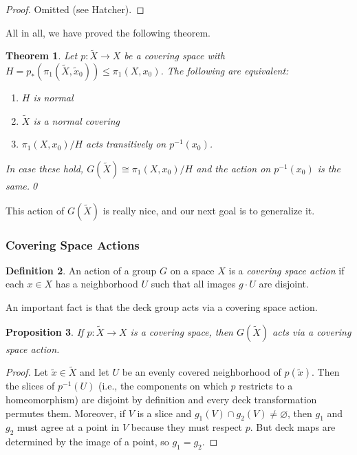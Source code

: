 \documentclass{article}
\newtheorem{thm}{Theorem}[section]
\newtheorem{prop}[thm]{Proposition}
\theoremstyle{definition}
\newtheorem{defi}[thm]{Definition}
\theoremstyle{remark}
\numberwithin{figure}{section}
\begin{document}
\begin{proof}
	Omitted (see Hatcher).
\end{proof}

All in all, we have proved the following theorem.

\begin{thm}
	Let $p : \tilde X \to X$ be a covering space with $H = p_*(\pi_1(\tilde X, \tilde x_0)) \leq \pi_1(X, x_0)$. The following are equivalent:\begin{enumerate}
		\item $H$ is normal
		\item $\tilde X$ is a normal covering
		\item $\pi_1(X, x_0)/H$ acts transitively on $p^{-1}(x_0)$.
	\end{enumerate}
	In case these hold, $G(\tilde X) \cong \pi_1(X, x_0)/H$ and the action on $p^{-1}(x_0)$ is the same.\qed
\end{thm}

This action of $G(\tilde X)$ is really nice, and our next goal is to generalize it.

\subsubsection{Covering Space Actions}
\begin{defi}
	An action of a group $G$ on a space $X$ is a \emph{covering space action} if each $x \in X$ has a neighborhood $U$ such that all images $g \cdot U$ are disjoint.
\end{defi}

An important fact is that the deck group acts via a covering space action.

\begin{prop}
	If $p : \tilde X \to X$ is a covering space, then $G(\tilde X)$ acts via a covering space action.
\end{prop}

\begin{proof}
	Let $\tilde x \in \tilde X$ and let $U$ be an evenly covered neighborhood of $p(\tilde x)$. Then the slices of $p^{-1}(U)$ (i.e., the components on which $p$ restricts to a homeomorphism) are disjoint by definition and every deck transformation permutes them. Moreover, if $V$ is a slice and $g_1(V) \cap g_2(V) \neq \varnothing$, then $g_1$ and $g_2$ must agree at a point in $V$ because they must respect $p$. But deck maps are determined by the image of a point, so $g_1 = g_2$.
\end{proof}
\end{document}

